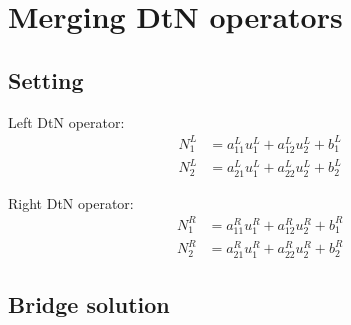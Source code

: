 \documentclass[fleqn]{article}
\begin{document}
\section{Merging DtN operators}

\subsection{Setting}

\begin{figure}[!h]
\end{figure}

Left DtN operator:
\begin{subequations}
\begin{align}
N_1^L &= a_{11}^L u_1^L + a_{12}^L u_2^L + b_1^L \\
N_2^L &= a_{21}^L u_1^L + a_{22}^L u_2^L + b_2^L
\end{align}
\end{subequations}

Right DtN operator:
\begin{subequations}
\begin{align}
N_1^R &= a_{11}^R u_1^R + a_{12}^R u_2^R + b_1^R \\
N_2^R &= a_{21}^R u_1^R + a_{22}^R u_2^R + b_2^R
\end{align}
\end{subequations}

\subsection{Bridge solution}
\end{document}
